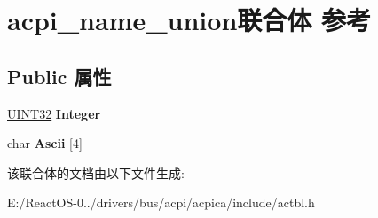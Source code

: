 \hypertarget{unionacpi__name__union}{}\section{acpi\+\_\+name\+\_\+union联合体 参考}
\label{unionacpi__name__union}
\subsection*{Public 属性}
\begin{DoxyCompactItemize}
\item 
\mbox{\label{unionacpi__name__union_a4ac9c8d4563c3735d14113e47bc0247f}} 
\hyperlink{_processor_bind_8h_ae1e6edbbc26d6fbc71a90190d0266018}{U\+I\+N\+T32} {\bfseries Integer}
\item 
\mbox{\label{unionacpi__name__union_a782dfa90b9555e768574e17862c4eb80}} 
char {\bfseries Ascii} \mbox{[}4\mbox{]}
\end{DoxyCompactItemize}


该联合体的文档由以下文件生成\+:\begin{DoxyCompactItemize}
\item 
E\+:/\+React\+O\+S-\/0../drivers/bus/acpi/acpica/include/actbl.\+h\end{DoxyCompactItemize}
